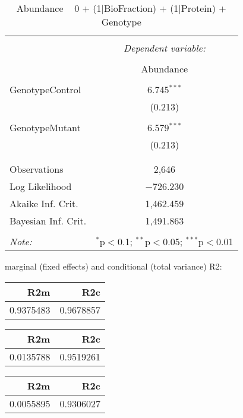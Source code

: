 \documentclass[11pt]{report}
\begin{document}
\begin{table}[!htbp] \centering 
  \caption{Abundance ~ 0 + (1|BioFraction) + (1|Protein) + Genotype} 
  \label{} 
\begin{tabular}{@{\extracolsep{5pt}}lc} 
\\[-1.8ex]\hline 
\hline \\[-1.8ex] 
 & \multicolumn{1}{c}{\textit{Dependent variable:}} \\ 
\cline{2-2} 
\\[-1.8ex] & Abundance \\ 
\hline \\[-1.8ex] 
 GenotypeControl & 6.745$^{***}$ \\ 
  & (0.213) \\ 
  & \\ 
 GenotypeMutant & 6.579$^{***}$ \\ 
  & (0.213) \\ 
  & \\ 
\hline \\[-1.8ex] 
Observations & 2,646 \\ 
Log Likelihood & $-$726.230 \\ 
Akaike Inf. Crit. & 1,462.459 \\ 
Bayesian Inf. Crit. & 1,491.863 \\ 
\hline 
\hline \\[-1.8ex] 
\textit{Note:}  & \multicolumn{1}{r}{$^{*}$p$<$0.1; $^{**}$p$<$0.05; $^{***}$p$<$0.01} \\ 
\end{tabular} 
\end{table} 
marginal (fixed effects) and conditional (total variance) R2:

\begin{tabular}{r|r}
\hline
R2m & R2c\\
\hline
0.9375483 & 0.9678857\\
\hline
\end{tabular}

\begin{tabular}{r|r}
\hline
R2m & R2c\\
\hline
0.0135788 & 0.9519261\\
\hline
\end{tabular}

\begin{tabular}{r|r}
\hline
R2m & R2c\\
\hline
0.0055895 & 0.9306027\\
\hline
\end{tabular}
\end{document}
